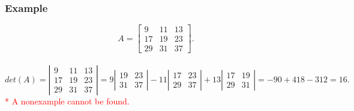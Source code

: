 \documentclass[a4paper,12pt]{article}
\begin{document}
\subsubsection*{Example}
\[
A=\left [\begin{array}{ccc}
    9&11&13\\
    17&19&23\\
    29&31&37
\end{array} \right ].\] \\ \[det(A) =\left |\begin{array}{ccc}
    9&11&13\\
    17&19&23\\
    29&31&37
\end{array} \right |= 9 \left |\begin{array}{ccc}
       19 &23\\
        31&37
\end{array}\right |- 11 \left |\begin{array}{ccc}
       17 &23\\
        29&37
\end{array}\right |+ 13 \left |\begin{array}{lll}
       17 &19\\
        29&31
\end{array}\right |=-90+418-312=16.
\]
\textcolor{red}{* A nonexample cannot be found.}
\end{document}
